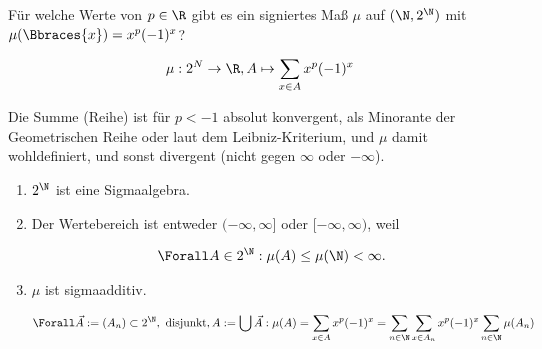 
\begin{exercise}

Für welche Werte von $p \in \R$ gibt es ein signiertes Maß $\mu$ auf $(\N, 2^\N)$ mit $\mu(\Bbraces{x}) = x^p (-1)^x$?

\end{exercise}


\begin{solution}

\begin{align*}
    \mu:
        2^N \to \R,
        A \mapsto \sum_{x \in A} x^p (-1)^x
\end{align*}

Die Summe (Reihe) ist für $p < -1$ absolut konvergent, als Minorante der Geometrischen Reihe oder laut dem Leibniz-Kriterium, und $\mu$ damit wohldefiniert, und sonst divergent (nicht gegen $\infty$ oder $-\infty$).


\begin{enumerate}

    \item $2^\N$ ist eine Sigmaalgebra.

    \item Der Wertebereich ist entweder $(-\infty, \infty]$ oder $[-\infty, \infty)$, weil
    
    \begin{align*}
        \Forall A \in 2^\N:
            \mu(A) \leq \mu(\N) < \infty.
    \end{align*}

    \item $\mu$ ist sigmaadditiv.
    
    \begin{align*}
        \Forall \vec A := (A_n) \subset 2^\N, ~\text{disjunkt}, A := \bigcup \vec A:
            \mu(A)
            =
            \sum_{x \in A}
                x^p (-1)^x
            =
            \sum_{n \in \N}
                \sum_{x \in A_n}
                    x^p (-1)^x
            \sum_{n \in \N}
                \mu(A_n)
    \end{align*}

\end{enumerate}

\end{solution}

